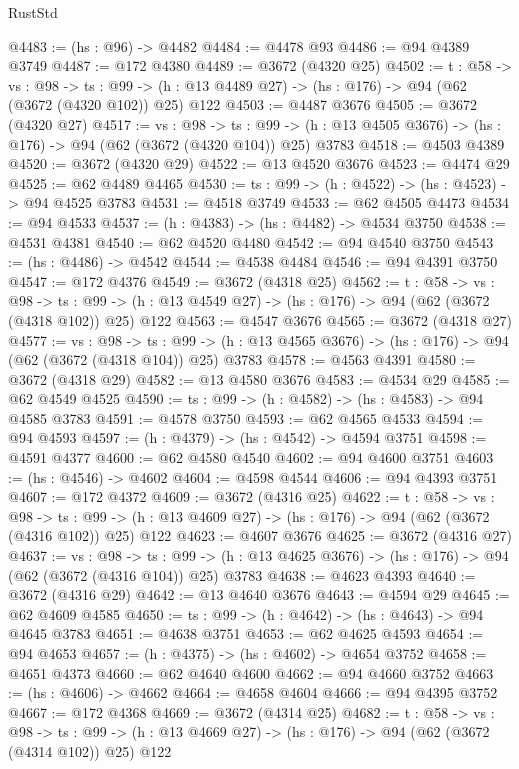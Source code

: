 \begin{lexlean}{RustStd}
\begin{coremodule}
{\begin{coremodule}
{{{{{{{{{{{@4483 := (hs : @96) -> @4482
@4484 := @4478 @93
@4486 := @94 @4389 @3749
@4487 := @172 @4380
@4489 := @3672 (@4320 @25)
@4502 := {t : @58} ->
  {vs : @98} ->
  {ts : @99} -> (h : @13 @4489 @27) -> (hs : @176) -> @94 (@62 (@3672 (@4320 @102)) @25) @122
@4503 := @4487 @3676
@4505 := @3672 (@4320 @27)
@4517 := {vs : @98} ->
  {ts : @99} -> (h : @13 @4505 @3676) -> (hs : @176) -> @94 (@62 (@3672 (@4320 @104)) @25) @3783
@4518 := @4503 @4389
@4520 := @3672 (@4320 @29)
@4522 := @13 @4520 @3676
@4523 := @4474 @29
@4525 := @62 @4489 @4465
@4530 := {ts : @99} -> (h : @4522) -> (hs : @4523) -> @94 @4525 @3783
@4531 := @4518 @3749
@4533 := @62 @4505 @4473
@4534 := @94 @4533
@4537 := (h : @4383) -> (hs : @4482) -> @4534 @3750
@4538 := @4531 @4381
@4540 := @62 @4520 @4480
@4542 := @94 @4540 @3750
@4543 := (hs : @4486) -> @4542
@4544 := @4538 @4484
@4546 := @94 @4391 @3750
@4547 := @172 @4376
@4549 := @3672 (@4318 @25)
@4562 := {t : @58} ->
  {vs : @98} ->
  {ts : @99} -> (h : @13 @4549 @27) -> (hs : @176) -> @94 (@62 (@3672 (@4318 @102)) @25) @122
@4563 := @4547 @3676
@4565 := @3672 (@4318 @27)
@4577 := {vs : @98} ->
  {ts : @99} -> (h : @13 @4565 @3676) -> (hs : @176) -> @94 (@62 (@3672 (@4318 @104)) @25) @3783
@4578 := @4563 @4391
@4580 := @3672 (@4318 @29)
@4582 := @13 @4580 @3676
@4583 := @4534 @29
@4585 := @62 @4549 @4525
@4590 := {ts : @99} -> (h : @4582) -> (hs : @4583) -> @94 @4585 @3783
@4591 := @4578 @3750
@4593 := @62 @4565 @4533
@4594 := @94 @4593
@4597 := (h : @4379) -> (hs : @4542) -> @4594 @3751
@4598 := @4591 @4377
@4600 := @62 @4580 @4540
@4602 := @94 @4600 @3751
@4603 := (hs : @4546) -> @4602
@4604 := @4598 @4544
@4606 := @94 @4393 @3751
@4607 := @172 @4372
@4609 := @3672 (@4316 @25)
@4622 := {t : @58} ->
  {vs : @98} ->
  {ts : @99} -> (h : @13 @4609 @27) -> (hs : @176) -> @94 (@62 (@3672 (@4316 @102)) @25) @122
@4623 := @4607 @3676
@4625 := @3672 (@4316 @27)
@4637 := {vs : @98} ->
  {ts : @99} -> (h : @13 @4625 @3676) -> (hs : @176) -> @94 (@62 (@3672 (@4316 @104)) @25) @3783
@4638 := @4623 @4393
@4640 := @3672 (@4316 @29)
@4642 := @13 @4640 @3676
@4643 := @4594 @29
@4645 := @62 @4609 @4585
@4650 := {ts : @99} -> (h : @4642) -> (hs : @4643) -> @94 @4645 @3783
@4651 := @4638 @3751
@4653 := @62 @4625 @4593
@4654 := @94 @4653
@4657 := (h : @4375) -> (hs : @4602) -> @4654 @3752
@4658 := @4651 @4373
@4660 := @62 @4640 @4600
@4662 := @94 @4660 @3752
@4663 := (hs : @4606) -> @4662
@4664 := @4658 @4604
@4666 := @94 @4395 @3752
@4667 := @172 @4368
@4669 := @3672 (@4314 @25)
@4682 := {t : @58} ->
  {vs : @98} ->
  {ts : @99} -> (h : @13 @4669 @27) -> (hs : @176) -> @94 (@62 (@3672 (@4314 @102)) @25) @122
}}}}}}}}}}}
\end{coremodule}}
\end{coremodule}
\end{lexlean}
